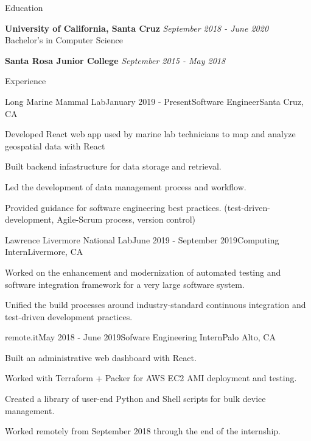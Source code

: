 \documentclass{resume} %
\begin{document}

\begin{rSection}{Education}

    {\bf University of California, Santa Cruz} \hfill {\em September 2018 - June 2020} \\ 
    Bachelor's in Computer Science

    {\bf Santa Rosa Junior College} \hfill {\em September 2015 - May 2018}

\end{rSection}


\begin{rSection}{Experience}
    \begin{rSubsection}{Long Marine Mammal Lab}{January 2019 - Present}{Software Engineer}{Santa Cruz, CA}
        \item Developed React web app used by marine lab technicians to map and analyze geospatial data with React
        \item Built backend infastructure for data storage and retrieval.
        \item Led the development of data management process and workflow.
        \item Provided guidance for software engineering best practices. (test-driven-development, Agile-Scrum process, version control)
    \end{rSubsection}

    \begin{rSubsection}{Lawrence Livermore National Lab}{June 2019 - September 2019}{Computing Intern}{Livermore, CA}
        \item Worked on the enhancement and modernization of automated testing and software integration framework for a very large software system.
        \item Unified the build processes around industry-standard continuous integration and test-driven development practices.
    \end{rSubsection}

    \begin{rSubsection}{remote.it}{May 2018 - June 2019}{Sofware Engineering Intern}{Palo Alto, CA}
        \item Built an administrative web dashboard with React.
        \item Worked with Terraform + Packer for AWS EC2 AMI deployment and testing.
        \item Created a library of user-end Python and Shell scripts for bulk device management.
        \item Worked remotely from September 2018 through the end of the internship.
    \end{rSubsection}

\end{rSection}
\end{document}
